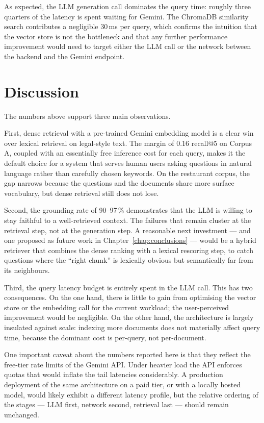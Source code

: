 As expected, the LLM generation call dominates the query time: roughly
three quarters of the latency is spent waiting for Gemini. The
ChromaDB similarity search contributes a negligible 30\,ms per query,
which confirms the intuition that the vector store is not the
bottleneck and that any further performance improvement would need to
target either the LLM call or the network between the backend and the
Gemini endpoint.

\section{Discussion}
\label{sec:discussion}

The numbers above support three main observations.

First, dense retrieval with a pre-trained Gemini embedding model is a
clear win over lexical retrieval on legal-style text. The margin of
0.16 recall@5 on Corpus A, coupled with an essentially free inference
cost for each query, makes it the default choice for a system that
serves human users asking questions in natural language rather than
carefully chosen keywords. On the restaurant corpus, the gap narrows
because the questions and the documents share more surface vocabulary,
but dense retrieval still does not lose.

Second, the grounding rate of 90--97\,\% demonstrates that the LLM is
willing to stay faithful to a well-retrieved context. The failures
that remain cluster at the retrieval step, not at the generation step.
A reasonable next investment --- and one proposed as future work in
Chapter~\ref{chap:conclusions} --- would be a hybrid retriever that
combines the dense ranking with a lexical rescoring step, to catch
questions where the ``right chunk'' is lexically obvious but
semantically far from its neighbours.

Third, the query latency budget is entirely spent in the LLM call.
This has two consequences. On the one hand, there is little to gain
from optimising the vector store or the embedding call for the
current workload; the user-perceived improvement would be negligible.
On the other hand, the architecture is largely insulated against
scale: indexing more documents does not materially affect query time,
because the dominant cost is per-query, not per-document.

One important caveat about the numbers reported here is that they
reflect the free-tier rate limits of the Gemini API. Under heavier
load the API enforces quotas that would inflate the tail latencies
considerably. A production deployment of the same architecture on a
paid tier, or with a locally hosted model, would likely exhibit a
different latency profile, but the relative ordering of the stages ---
LLM first, network second, retrieval last --- should remain
unchanged.
